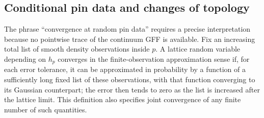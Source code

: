 \subsection{Conditional pin data and changes of topology}

The phrase ``convergence at random pin data'' requires
a precise interpretation because no pointwise trace
of the continuum GFF is available.  Fix an increasing
total list of smooth density observations inside
$p$.  A lattice random variable depending on $h_p$
converges in the finite-observation approximation
sense if, for each error tolerance, it can be
approximated in probability by a function of a
sufficiently long fixed list of these observations,
with that function converging to its Gaussian
counterpart; the error then tends to zero as the
list is increased after the lattice limit.  This
definition also specifies joint convergence of
any finite number of such quantities.

